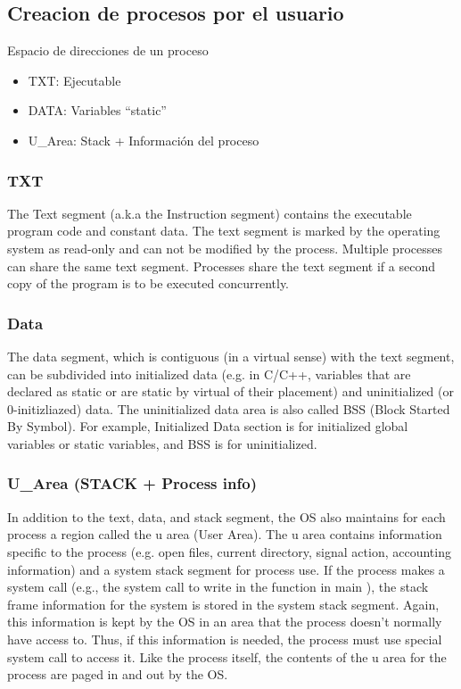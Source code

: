 \documentclass[a4paper, twoside]{article}
\begin{document}
\subsection{Creacion de procesos por el usuario}
Espacio de direcciones de un proceso

\begin{itemize}
	\item TXT: Ejecutable
	\item DATA: Variables “static”
	\item U\_Area: Stack + Información del proceso
\end{itemize}

\subsubsection{TXT}
The Text segment (a.k.a the Instruction segment) contains the executable program code and constant data. The text segment is marked by the operating system as read-only and can not be modified by the process. Multiple processes can share the same text segment. Processes share the text segment if a second copy of the program is to be executed concurrently.

\subsubsection{Data}
The data segment, which is contiguous (in a virtual sense) with the text segment, can be subdivided into initialized data (e.g. in C/C++, variables that are declared as static or are static by virtual of their placement) and uninitialized (or 0-initizliazed) data. The uninitialized data area is also called BSS (Block Started By Symbol). For example, Initialized Data section is for initialized global variables or static variables, and BSS is for uninitialized.

\subsubsection{U\_Area (STACK + Process info)}
In addition to the text, data, and stack segment, the OS also maintains for each process a region called the u area (User Area). The u area contains information specific to the process (e.g. open files, current directory, signal action, accounting information) and a system stack segment for process use. If the process makes a system call (e.g., the system call to write in the function in main ), the stack frame information for the system is stored in the system stack segment. Again, this information is kept by the OS in an area that the process doesn't normally have access to. Thus, if this information is needed, the process must use special system call to access it. Like the process itself, the contents of the u area for the process are paged in and out by the OS.
\end{document}
